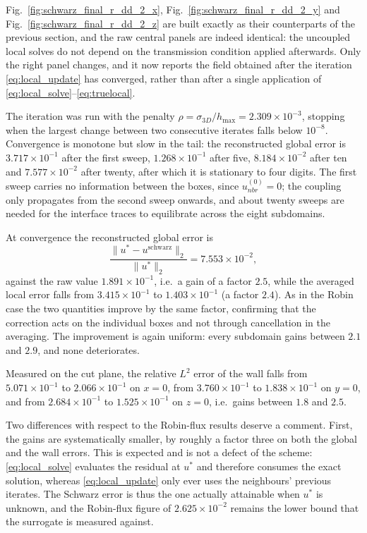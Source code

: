 Fig.~\ref{fig:schwarz_final_r_dd_2_x}, Fig.~\ref{fig:schwarz_final_r_dd_2_y} and Fig.~\ref{fig:schwarz_final_r_dd_2_z} are built exactly as their counterparts of the previous section, and the raw central panels are indeed identical: the uncoupled local solves do not depend on the transmission condition applied afterwards. Only the right panel changes, and it now reports the field obtained after the iteration \eqref{eq:local_update} has converged, rather than after a single application of \eqref{eq:local_solve}--\eqref{eq:truelocal}.

The iteration was run with the penalty $\rho = \sigma_{3D}/h_{\max} = 2.309\times10^{-3}$, stopping when the largest change between two consecutive iterates falls below $10^{-8}$. Convergence is monotone but slow in the tail: the reconstructed global error is $3.717\times10^{-1}$ after the first sweep, $1.268\times10^{-1}$ after five, $8.184\times10^{-2}$ after ten and $7.577\times10^{-2}$ after twenty, after which it is stationary to four digits. The first sweep carries no information between the boxes, since $u_{nbr}^{(0)} = 0$; the coupling only propagates from the second sweep onwards, and about twenty sweeps are needed for the interface traces to equilibrate across the eight subdomains.

At convergence the reconstructed global error is
\[
\frac{\lVert u^* - u^{\mathrm{schwarz}}\rVert_2}{\lVert u^*\rVert_2} = 7.553\times10^{-2},
\]
against the raw value $1.891\times10^{-1}$, i.e.\ a gain of a factor $2.5$, while the averaged local error falls from $3.415\times10^{-1}$ to $1.403\times10^{-1}$ (a factor $2.4$). As in the Robin case the two quantities improve by the same factor, confirming that the correction acts on the individual boxes and not through cancellation in the averaging. The improvement is again uniform: every subdomain gains between $2.1$ and $2.9$, and none deteriorates.

Measured on the cut plane, the relative $L^2$ error of the wall falls from $5.071\times10^{-1}$ to $2.066\times10^{-1}$ on $x=0$, from $3.760\times10^{-1}$ to $1.838\times10^{-1}$ on $y=0$, and from $2.684\times10^{-1}$ to $1.525\times10^{-1}$ on $z=0$, i.e.\ gains between $1.8$ and $2.5$.

Two differences with respect to the Robin-flux results deserve a comment. First, the gains are systematically smaller, by roughly a factor three on both the global and the wall errors. This is expected and is not a defect of the scheme: \eqref{eq:local_solve} evaluates the residual at $u^*$ and therefore consumes the exact solution, whereas \eqref{eq:local_update} only ever uses the neighbours' previous iterates. The Schwarz error is thus the one actually attainable when $u^*$ is unknown, and the Robin-flux figure of $2.625\times10^{-2}$ remains the lower bound that the surrogate is measured against.

